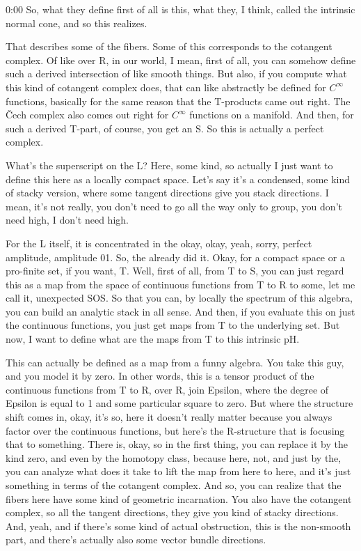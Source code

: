 \begin{unfinished}{0:00}
So, what they define first of all is this, what they, I think, called the intrinsic normal cone, and so this realizes.

That describes some of the fibers. Some of this corresponds to the cotangent complex. Of like over R, in our world, I mean, first of all, you can somehow define such a derived intersection of like smooth things. But also, if you compute what this kind of cotangent complex does, that can like abstractly be defined for $C^\infty$ functions, basically for the same reason that the T-products came out right. The Čech complex also comes out right for $C^\infty$ functions on a manifold. And then, for such a derived T-part, of course, you get an S. So this is actually a perfect complex.

What's the superscript on the L? Here, some kind, so actually I just want to define this here as a locally compact space. Let's say it's a condensed, some kind of stacky version, where some tangent directions give you stack directions. I mean, it's not really, you don't need to go all the way only to group, you don't need high, I don't need high.

For the L itself, it is concentrated in the okay, okay, yeah, sorry, perfect amplitude, amplitude 01. So, the already did it. Okay, for a compact space or a pro-finite set, if you want, T. Well, first of all, from T to S, you can just regard this as a map from the space of continuous functions from T to R to some, let me call it, unexpected SOS. So that you can, by locally the spectrum of this algebra, you can build an analytic stack in all sense. And then, if you evaluate this on just the continuous functions, you just get maps from T to the underlying set. But now, I want to define what are the maps from T to this intrinsic pH.

This can actually be defined as a map from a funny algebra. You take this guy, and you model it by zero. In other words, this is a tensor product of the continuous functions from T to R, over R, join Epsilon, where the degree of Epsilon is equal to 1 and some particular square to zero. But where the structure shift comes in, okay, it's so, here it doesn't really matter because you always factor over the continuous functions, but here's the R-structure that is focusing that to something. There is, okay, so in the first thing, you can replace it by the kind zero, and even by the homotopy class, because here, not, and just by the, you can analyze what does it take to lift the map from here to here, and it's just something in terms of the cotangent complex. And so, you can realize that the fibers here have some kind of geometric incarnation. You also have the cotangent complex, so all the tangent directions, they give you kind of stacky directions. And, yeah, and if there's some kind of actual obstruction, this is the non-smooth part, and there's actually also some vector bundle directions.


\end{unfinished}
